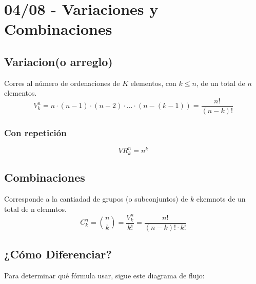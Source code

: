 \documentclass[12pt, letterpaper]{article}
\begin{document}
\newpage

\section{04/08 - Variaciones y Combinaciones}
\subsection{Variacion(o arreglo)}
Corres al número de ordenaciones de $K$ elementos, con $k \leq n$, de un total de $n$ elementos.
\[V_k^n = n \cdot (n - 1) \cdot (n - 2) \cdot ... \cdot (n - (k - 1)) = \frac{n!}{(n - k)!} \]
\subsubsection*{Con repetición}
\[VR_k^n = n^k \]
\subsection{Combinaciones} Corresponde a la cantiadad de grupos (o subconjuntos) de $k$ ekemnots de un total de n elemntos.
\[C_k^n = \binom{n}{k} = \frac{V_k^n}{k!} = \frac{n!}{(n - k)! \cdot k!} \]

\subsection*{¿Cómo Diferenciar?}
Para determinar qué fórmula usar, sigue este diagrama de flujo:
\end{document}
